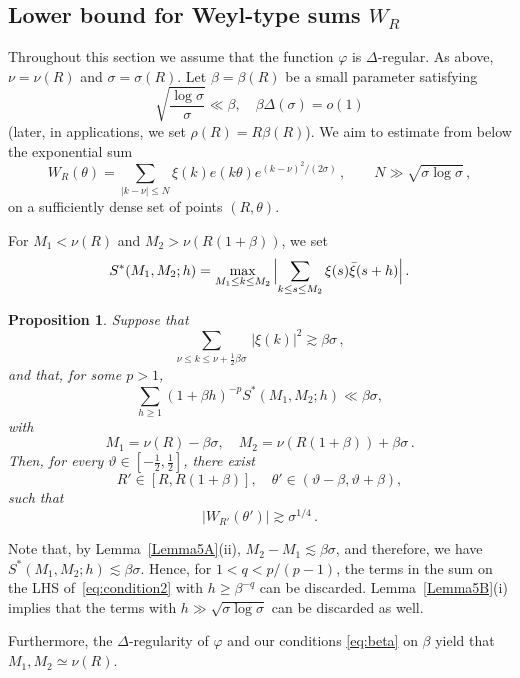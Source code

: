 \documentclass[11pt]{amsart}
\numberwithin{equation}{section}
\newtheorem{proposition}{Proposition}
\begin{document}
\subsection{Lower bound for Weyl-type sums $W_R$}\label{subsec:LB-Lebesgue}

Throughout this section we assume that the function $\varphi$ is $\Delta$-regular.
As above, $\nu=\nu(R)$ and $\sigma=\sigma(R)$. Let $\beta=\beta(R)$ be a small parameter
satisfying
\begin{equation}\label{eq:beta}
\sqrt{\frac{\log\sigma}\sigma} \ll \beta, \quad \beta\Delta(\sigma) = o(1)
\end{equation}
(later, in applications, we set $\rho(R)=R\beta(R)$).
We aim to estimate from below the exponential sum
\[
W_R(\theta) = \sum_{|k-\nu|\le N} \xi (k) e(k\theta)e^{(k-\nu)^2/(2\sigma)}\,,
\qquad N \gg \sqrt{\sigma\log\sigma}\,,
\]
on a sufficiently dense set of points $(R, \theta)$.

For $M_1<\nu(R)$ and $M_2>\nu(R(1+\beta))$, we set
\[
S^*(M_1, M_2; h) = \max_{M_1\le k \le M_2}\,
\Bigl| \sum_{k\le s \le M_2} \xi(s)\bar\xi(s+h)\Bigr|\,.
\]

\begin{proposition}\label{Lemma5}
Suppose that
\begin{equation}
\label{eq:condition1}
\sum_{\nu \le k \le \nu+\frac12 \beta\sigma}\, |\xi(k)|^2 \gtrsim \beta\sigma\,,
\end{equation}
and that, for some $p>1$,
\begin{equation}
\label{eq:condition2}
\sum_{h \ge 1} (1+\beta h)^{-p} S^*(M_1, M_2; h) \ll \beta\sigma,
\end{equation}
with
\[
M_1 = \nu (R) - \beta\sigma, \quad M_2 =  \nu(R(1+\beta)) + \beta\sigma\,.
\]
Then, for every $\vartheta\in [-\frac12, \frac12]$, there exist
\[
R'\in [R, R(1+\beta)], \quad \theta'\in (\vartheta-\beta, \vartheta+\beta),
\]
such that
\[
|W_{R'}(\theta')| \gtrsim \sigma^{1/4}\,.
\]
\end{proposition}

Note that, by Lemma~\ref{Lemma5A}(ii),
$M_2 - M_1 \lesssim \beta\sigma$, and therefore, we have 
$S^*(M_1, M_2; h) \lesssim \beta\sigma$. Hence,
for $1<q<p/(p-1)$, the terms in the sum on the LHS of~\eqref{eq:condition2} with $h\ge \beta^{-q}$ can be discarded.  
Lemma~\ref{Lemma5B}(i) implies that 
the terms with $h\gg \sqrt{\sigma\log\sigma}$ can be discarded as well.

Furthermore, the $\Delta$-regularity of $\varphi$ and our conditions \eqref{eq:beta} on $\beta$ yield that $M_1,M_2\simeq \nu(R)$.
\end{document}

